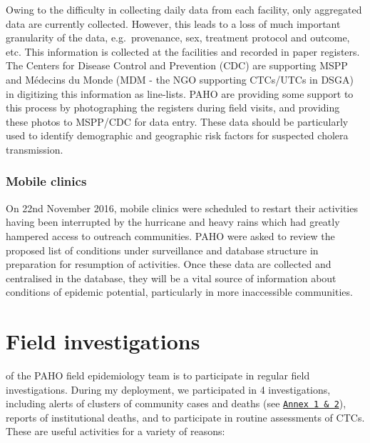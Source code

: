 \documentclass[]{tufte-handout}
\begin{document}
Owing to the difficulty in collecting daily data from each facility,
only aggregated data are currently collected. However, this leads to a
loss of much important granularity of the data, e.g.~provenance, sex,
treatment protocol and outcome, etc. This information is collected at
the facilities and recorded in paper registers. The Centers for Disease
Control and Prevention (CDC) are supporting MSPP and Médecins du Monde
(MDM - the NGO supporting CTCs/UTCs in DSGA) in digitizing this
information as line-lists. PAHO are providing some support to this
process by photographing the registers during field visits, and
providing these photos to MSPP/CDC for data entry. These data should be
particularly used to identify demographic and geographic risk factors
for suspected cholera transmission.

\subsubsection{Mobile clinics}\label{mobile-clinics}

On 22nd November 2016, mobile clinics were scheduled to restart their
activities having been interrupted by the hurricane and heavy rains
which had greatly hampered access to outreach communities. PAHO were
asked to review the proposed list of conditions under surveillance and
database structure in preparation for resumption of activities. Once
these data are collected and centralised in the database, they will be a
vital source of information about conditions of epidemic potential,
particularly in more inaccessible communities.

\section{Field investigations}\label{field-investigations}

 of the PAHO field epidemiology team is to
participate in regular field investigations. During my deployment, we
participated in 4 investigations, including alerts of clusters of
community cases and deaths (see
\protect\hyperlink{annexes}{\texttt{Annex\ 1\ \&\ 2}}), reports of
institutional deaths, and to participate in routine assessments of CTCs.
These are useful activities for a variety of reasons:
\end{document}
